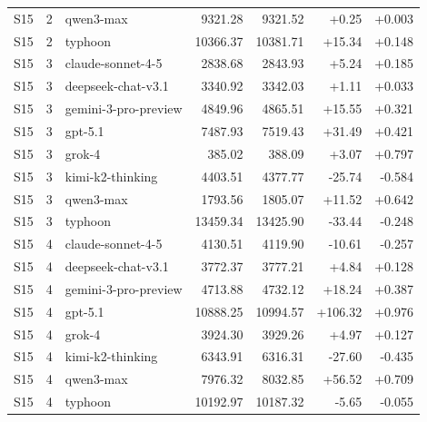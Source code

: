 \begin{longtable}{rrlrrrr}
S15 & 2 & qwen3-max & 9321.28 & 9321.52 & +0.25 & +0.003 \\
S15 & 2 & typhoon & 10366.37 & 10381.71 & +15.34 & +0.148 \\
S15 & 3 & claude-sonnet-4-5 & 2838.68 & 2843.93 & +5.24 & +0.185 \\
S15 & 3 & deepseek-chat-v3.1 & 3340.92 & 3342.03 & +1.11 & +0.033 \\
S15 & 3 & gemini-3-pro-preview & 4849.96 & 4865.51 & +15.55 & +0.321 \\
S15 & 3 & gpt-5.1 & 7487.93 & 7519.43 & +31.49 & +0.421 \\
S15 & 3 & grok-4 & 385.02 & 388.09 & +3.07 & +0.797 \\
S15 & 3 & kimi-k2-thinking & 4403.51 & 4377.77 & -25.74 & -0.584 \\
S15 & 3 & qwen3-max & 1793.56 & 1805.07 & +11.52 & +0.642 \\
S15 & 3 & typhoon & 13459.34 & 13425.90 & -33.44 & -0.248 \\
S15 & 4 & claude-sonnet-4-5 & 4130.51 & 4119.90 & -10.61 & -0.257 \\
S15 & 4 & deepseek-chat-v3.1 & 3772.37 & 3777.21 & +4.84 & +0.128 \\
S15 & 4 & gemini-3-pro-preview & 4713.88 & 4732.12 & +18.24 & +0.387 \\
S15 & 4 & gpt-5.1 & 10888.25 & 10994.57 & +106.32 & +0.976 \\
S15 & 4 & grok-4 & 3924.30 & 3929.26 & +4.97 & +0.127 \\
S15 & 4 & kimi-k2-thinking & 6343.91 & 6316.31 & -27.60 & -0.435 \\
S15 & 4 & qwen3-max & 7976.32 & 8032.85 & +56.52 & +0.709 \\
S15 & 4 & typhoon & 10192.97 & 10187.32 & -5.65 & -0.055 \\
\bottomrule\end{longtable}
